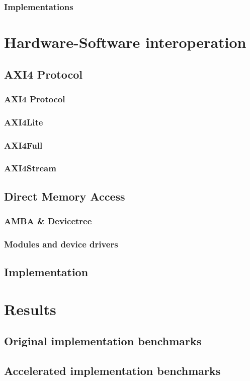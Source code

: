 \documentclass{iccmemoria}
\begin{document}
    \subsection{Implementations}
    
\chapter{Hardware-Software interoperation}
\section{AXI4 Protocol}
  \subsection{AXI4 Protocol}
  \subsection{AXI4Lite}
  \subsection{AXI4Full}
  \subsection{AXI4Stream}
\section{Direct Memory Access}
  \subsection{AMBA \& Devicetree}
  \subsection{Modules and device drivers}
\section{Implementation}

\chapter{Results}
\section{Original implementation benchmarks}
\section{Accelerated implementation benchmarks}
\end{document}

